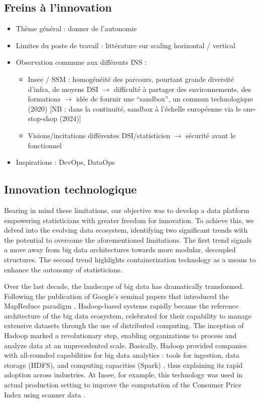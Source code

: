 \subsection{Freins à l'innovation}
\begin{itemize}
    \item Thème général : donner de l'autonomie
    \item Limites du poste de travail : littérature sur scaling horizontal / vertical
    \item Observation commune aux différents INS :
    \begin{itemize}
        \item Insee / SSM : homogénéité des parcours, pourtant grande diversité d'infra, de moyens DSI $\rightarrow$ difficulté à partager des environnements, des formations $\rightarrow$ idée de fournir une ``sandbox'', un commun technologique (2020) [NB : dans la continuité, sandbox à l'échelle européenne via le one-stop-shop (2024)]
        \item Visions/incitations différentes DSI/statisticien $\rightarrow$ sécurité avant le fonctionnel
    \end{itemize}
    \item Inspirations : DevOps, DataOps
\end{itemize}

\subsection{Innovation technologique}

Bearing in mind these limitations, our objective was to develop a data platform empowering statisticians with greater freedom for innovation. To achieve this, we delved into the evolving data ecosystem, identifying two significant trends with the potential to overcome the aforementioned limitations. The first trend signals a move away from big data architectures towards more modular, decoupled structures. The second trend highlights containerization technology as a means to enhance the autonomy of statisticians.

Over the last decade, the landscape of big data has dramatically transformed. Following the publication of Google's seminal papers that introduced the MapReduce paradigm \cite{ghemawat2003google, dean2008mapreduce}, Hadoop-based systems rapidly became the reference architecture of the big data ecosystem, celebrated for their capability to manage extensive datasets through the use of distributed computing. The inception of Hadoop marked a revolutionary step, enabling organizations to process and analyze data at an unprecedented scale. Basically, Hadoop provided companies with all-rounded capabilities for big data analytics : tools for ingestion, data storage (HDFS), and computing capacities (Spark) \cite{dhyani2014big}, thus explaining its rapid adoption across industries. At Insee, for example, this technology was used in actual production setting to improve the computation of the Consumer Price Index using scanner data \cite{leclair2019utiliser}.

